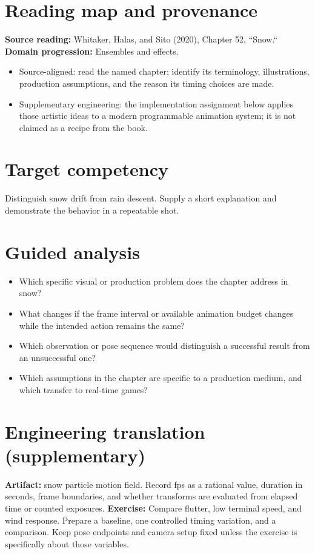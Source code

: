 \documentclass[10pt,letterpaper]{article}
\begin{document}
\makedoctitle
\makedocsummary

\section{Reading map and provenance}
\textbf{Source reading:} Whitaker, Halas, and Sito (2020), Chapter 52, ``Snow.``\\
\textbf{Domain progression:} Ensembles and effects.
\begin{itemize}
\item Source-aligned: read the named chapter; identify its terminology, illustrations, production assumptions, and the reason its timing choices are made.
\item Supplementary engineering: the implementation assignment below applies those artistic ideas to a modern programmable animation system; it is not claimed as a recipe from the book.
\end{itemize}
\section{Target competency}
Distinguish snow drift from rain descent. Supply a short explanation and demonstrate the behavior in a repeatable shot.
\section{Guided analysis}
\begin{itemize}
\item Which specific visual or production problem does the chapter address in snow?
\item What changes if the frame interval or available animation budget changes while the intended action remains the same?
\item Which observation or pose sequence would distinguish a successful result from an unsuccessful one?
\item Which assumptions in the chapter are specific to a production medium, and which transfer to real-time games?
\end{itemize}
\section{Engineering translation (supplementary)}
\textbf{Artifact:} snow particle motion field. Record fps as a rational value, duration in seconds, frame boundaries, and whether transforms are evaluated from elapsed time or counted exposures.
\textbf{Exercise:} Compare flutter, low terminal speed, and wind response. Prepare a baseline, one controlled timing variation, and a comparison. Keep pose endpoints and camera setup fixed unless the exercise is specifically about those variables.
\end{document}

